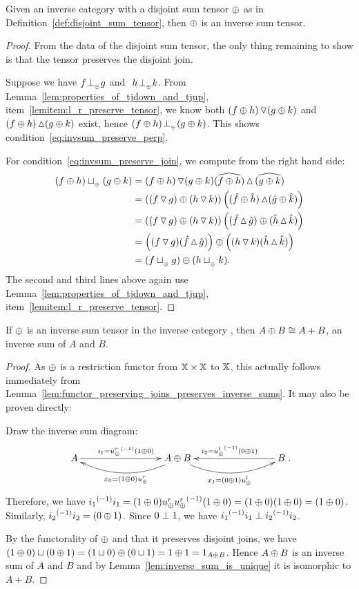 \begin{lemma}\label{lem:a_disjoint_sum_tensor_is_an_inverse_sum_tensor}
  Given an inverse category \X with a disjoint sum tensor $\oplus$ as in
  Definition~\ref{def:disjoint_sum_tensor}, then $\oplus$ is an inverse sum tensor.
\end{lemma}
\begin{proof}
  From the data of the disjoint sum tensor, the only thing remaining to show is that the tensor
  preserves the disjoint join.

  Suppose we have $f {}_{{}_{}}{\perp_{{}_{\oplus}}} g$ and $\ h {}_{{}_{}}{\perp_{{}_{\oplus}}} k$.
  From Lemma~\ref{lem:properties_of_tjdown_and_tjup}, item~\ref{lemitem:l_r_preserve_tensor}, we
  know both $(f\oplus h)\operatorname{\triangledown}(g\oplus k)$ and $(f\oplus h)\operatorname{\vartriangle}(g\oplus k)$ exist, hence $(f\oplus h){}_{{}_{}}{\perp_{{}_{\oplus}}}(g\oplus k)$.
  This shows condition~\eqref{eq:invsum_preserve_perp}.

  For condition~\eqref{eq:invsum_preserve_join}, we compute from the right hand side:
  \begin{align*}
    (f\oplus h)\sqcup_{{_{\oplus}}}(g\oplus k) &= (f\oplus h)\operatorname{\triangledown} (g\oplus k) \widehat{(f\oplus h)}\operatorname{\vartriangle} \widehat{(g\oplus k)}\\
    &= \left( (f\operatorname{\triangledown} g)\oplus (h \operatorname{\triangledown} k) \right)
       \left( (\hat{f}\oplus\hat{h}) \operatorname{\vartriangle} (\hat{g}\oplus\hat{k}) \right) \\
    &= \left( (f\operatorname{\triangledown} g)\oplus (h \operatorname{\triangledown} k) \right)
       \left( (\hat{f}\operatorname{\vartriangle} \hat{g}) \oplus (\hat{h}\operatorname{\vartriangle}\hat{k}) \right) \\
    &= \left( (f\operatorname{\triangledown} g)(\hat{f}\operatorname{\vartriangle} \hat{g})\right) \oplus
       \left((h \operatorname{\triangledown} k) (\hat{h}\operatorname{\vartriangle}\hat{k}) \right) \\
    &=  (f\sqcup_{{_{\oplus}}} g)\oplus(h \sqcup_{{_{\oplus}}} k).
  \end{align*}
  The second and third lines above again use Lemma~\ref{lem:properties_of_tjdown_and_tjup},
  item~\ref{lemitem:l_r_preserve_tensor}.

\end{proof}

\begin{lemma}\label{lem:an_inverse_sum_tensor_gives_inverse_sums}
  If $\oplus$ is an inverse sum tensor in the inverse category \X, then $A\oplus B \cong A+B$, an inverse
  sum of $A$ and $B$.
\end{lemma}
\begin{proof}
  As $\oplus$ is a restriction functor from $\mathbb{X}\times\mathbb{X}$ to $\mathbb{X}$, this actually follows immediately
  from Lemma~\ref{lem:functor_preserving_joins_preserves_inverse_sums}. It may also be proven
  directly:

  Draw the inverse sum diagram:
  \[
    \xymatrix @C+60pt{
      A\ar[r]^{i_1=\inv{\upr} (1\+0)}
        & A\+B \ar@/^15pt/[l]^{x_0=(1\+0)\upr} \ar@/_15pt/[r]_{x_1=(0\+1)\upl}
          & B \ar[l]_{i_2=\inv{\upl} (0\+1)}
    }.
  \]
  Therefore, we have ${i_1}^{(-1)}i_1 =
  (1\oplus0)u_{\oplus}^r {u_{\oplus}^r}^{(-1)} (1\oplus0) = (1\oplus0)(1\oplus0) = (1\oplus0)$. Similarly, ${i_2}^{(-1)} i_2 = (0\oplus1)$.
  Since $0\perp 1$, we have ${i_1}^{(-1)}i_1 \perp {i_2}^{(-1)} i_2$.

  By the functorality of $\oplus$ and that it preserves disjoint joins, we have $(1\oplus0) \sqcup (0 \oplus1)
  = (1\sqcup 0 ) \oplus (0\sqcup 1) = 1 \oplus 1 = 1_{A\oplus B}$. Hence $A\oplus B$ is an inverse sum of $A$ and
  $B$ and by Lemma~\ref{lem:inverse_sum_is_unique} it is isomorphic to $A+B$.
\end{proof}

